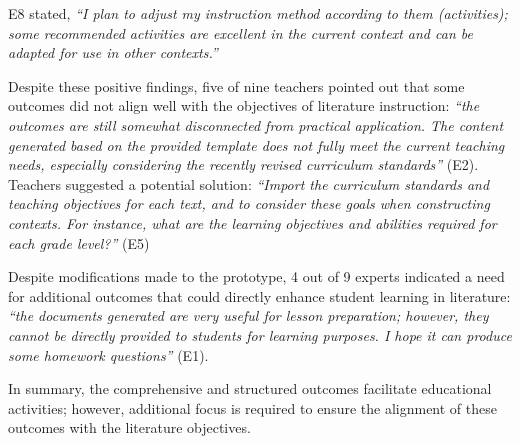 E8 stated, 
\textit{``I plan to adjust my instruction method according to them (activities); some recommended activities are excellent in the current context and can be adapted for use in other contexts.''
}

Despite these positive findings, five of nine teachers pointed out that some outcomes did not align well with the objectives of literature instruction: \textit{``the outcomes are still somewhat disconnected from practical application. The content generated based on the provided template does not fully meet the current teaching needs, especially considering the recently revised curriculum standards''} (E2).
Teachers suggested a potential solution: \textit{``Import the curriculum standards and teaching objectives for each text, and to consider these goals when constructing contexts. For instance, what are the learning objectives and abilities required for each grade level?''} (E5)

Despite modifications made to the prototype, 4 out of 9 experts indicated a need for additional outcomes that could directly enhance student learning in literature: \textit{``the documents generated are very useful for lesson preparation; however, they cannot be directly provided to students for learning purposes. I hope it can produce some homework questions''} (E1).


In summary, the comprehensive and structured outcomes facilitate educational activities; however, additional focus is required to ensure the alignment of these outcomes with the literature objectives.

